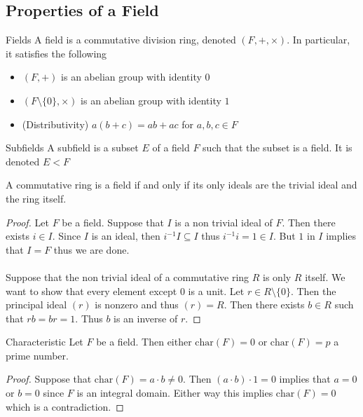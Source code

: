\documentclass[a4paper]{article}
\begin{document}
\subsection{Properties of a Field}
\begin{defn}{Fields}{} A field is a commutative division ring, denoted $(F,+,\times)$. In particular, it satisfies the following
\begin{itemize}
\item $(F,+)$ is an abelian group with identity $0$
\item $(F\setminus\{0\},\times)$ is an abelian group with identity $1$
\item (Distributivity) $a(b+c)=ab+ac$ for $a,b,c\in F$
\end{itemize}
\end{defn}

\begin{defn}{Subfields}{} A subfield is a subset $E$ of a field $F$ such that the subset is a field. It is denoted $E<F$
\end{defn}

\begin{prp}{}{} A commutative ring is a field if and only if its only ideals are the trivial ideal and the ring itself. \tcbline
\begin{proof}
Let $F$ be a field. Suppose that $I$ is a non trivial ideal of $F$. Then there exists $i\in I$. Since $I$ is an ideal, then $i^{-1}I\subseteq I$ thus $i^{-1}i=1\in I$. But $1$ in $I$ implies that $I=F$ thus we are done. \\~\\
Suppose that the non trivial ideal of a commutative ring $R$ is only $R$ itself. We want to show that every element except $0$ is a unit. Let $r\in R\setminus\{0\}$. Then the principal ideal $(r)$ is nonzero and thus $(r)=R$. Then there exists $b\in R$ such that $rb=br=1$. Thus $b$ is an inverse of $r$. 
\end{proof}
\end{prp}

\begin{prp}{Characteristic}{} Let $F$ be a field. Then either $\text{char}(F)=0$ or $\text{char}(F)=p$ a prime number. \tcbline
\begin{proof}
Suppose that $\text{char}(F)=a\cdot b\neq 0$. Then $(a\cdot b)\cdot 1=0$ implies that $a=0$ or $b=0$ since $F$ is an integral domain. Either way this implies $\text{char}(F)=0$ which is a contradiction. 
\end{proof}
\end{prp}
\end{document}
